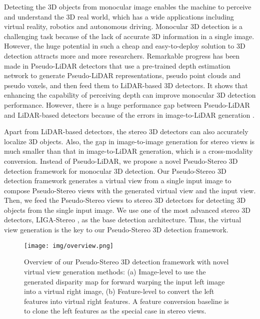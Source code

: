 \documentclass[10pt,twocolumn,letterpaper]{article}
\begin{document}
Detecting the 3D objects from monocular image enables the machine to perceive and understand the 3D real world, which has a wide applications including virtual reality, robotics and autonomous driving. Monocular 3D detection is a challenging task because of the lack of accurate 3D information in a single image. However, the huge potential in such a cheap and easy-to-deploy solution to 3D detection attracts more and more researchers. 
Remarkable progress has been made in Pseudo-LiDAR detectors \cite{Ma_2020_ECCV,you2020pseudo,Liang_corr,simonelli2021we,chu2021neighbor} that use a pre-trained depth estimation network to generate Pseudo-LiDAR representations,  pseudo point clouds and pseudo voxels, and then feed them to LiDAR-based 3D detectors. It shows that enhancing the capability of perceiving depth can improve monocular 3D detection performance. However, there is a huge performance gap between Pseudo-LiDAR and LiDAR-based detectors because of the errors in image-to-LiDAR generation \cite{dd3d}.  

Apart from LiDAR-based detectors, the stereo 3D detectors \cite{guo2021liga,chen2020dsgn} can also accurately localize 3D objects. Also, the gap in image-to-image generation for stereo views is much smaller than that in image-to-LiDAR generation, which is a cross-modality conversion. Instead of Pseudo-LiDAR, we propose a novel Pseudo-Stereo 3D detection framework for monocular 3D detection. Our Pseudo-Stereo 3D detection framework generates a virtual view from a single input image to compose Pseudo-Stereo views with the generated virtual view and the input view. Then, we feed the Pseudo-Stereo views to stereo 3D detectors for detecting 3D objects from the single input image. We use one of the most advanced stereo 3D detectors, LIGA-Stereo \cite{guo2021liga}, as the base detection architecture. Thus, the virtual view generation is the key to our Pseudo-Stereo 3D detection framework.



\begin{figure}[t!]
  \centering
 \texttt{[image: img/overview.png]}
\vspace{-5mm}
  \caption{Overview of our Pseudo-Stereo 3D detection framework with novel virtual view generation methods: (a) Image-level to use the generated disparity map for forward warping the input left image into a virtual right image, (b) Feature-level to convert the left features into virtual right features. A feature conversion baseline is to clone the left features as the special case in stereo views.
} 
 \label{fig:virtual}
\vspace{-5mm}
\end{figure} 
\end{document}
